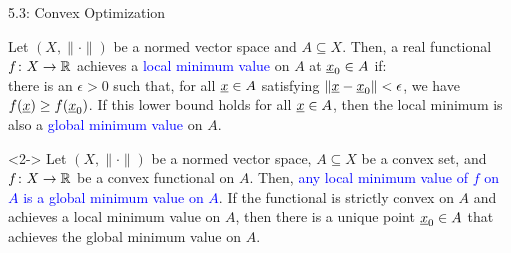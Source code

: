 \documentclass[10pt,english,aspectratio=169]{beamer}
\begin{document}
\begin{frame}{5.3: Convex Optimization}

\begin{definition}
Let $(X,\|\cdot\|)$ be a normed vector space and $A\subseteq X$.
Then, a real functional $f \colon X \rightarrow \mathbb{R}$ achieves a \textcolor{blue}{local minimum value} on $A$ at $\underline{x}_0 \in A$ if: \\ \hspace{3mm}  there is an $\epsilon > 0$ such that, for all $\underline{x}\in A$ satisfying $\| \underline{x} - \underline{x}_0 \| < \epsilon$, we have  $f(\underline{x}) \geq f(\underline{x}_0)$.
If this lower bound holds for all $\underline{x}\in A$, then the local minimum is also a \textcolor{blue}{global minimum value} on $A$.
\end{definition}

\vspace{2mm}

\begin{theorem}<2->
Let $(X,\|\cdot\|)$ be a normed vector space, $A \subseteq X$ be a convex set, and $f \colon X \rightarrow \mathbb{R}$ be a convex functional on $A$.
Then, \textcolor{blue}{any local minimum value of $f$ on $A$ is a global minimum value on $A$}.
If the functional is strictly convex on $A$ and achieves a local minimum value on $A$, then there is a unique point $\underline{x}_0 \in A$ that achieves the global minimum value on $A$.
\end{theorem}

\vspace{1mm}


\end{frame}
\end{document}
